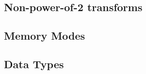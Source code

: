 \subsection{Non-power-of-2 transforms}
\label{ssec:nonpowerof2}

\subsection{Memory Modes}
\label{ssec:mem_mode}

\subsection{Data Types}
\label{ssec:data_types}

